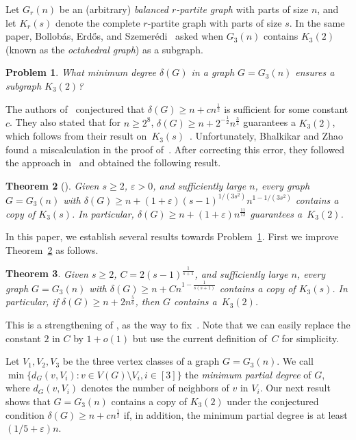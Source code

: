 \documentclass[11pt]{article}
\newtheorem{theorem}{Theorem}[section]
\newtheorem{problem}[theorem]{Problem}
\newcommand{\eps}{\varepsilon}
\numberwithin{equation}{section}
\begin{document}
	Let $G_r(n)$ be an (arbitrary) \emph{balanced $r$-partite graph} with parts of size $n$, and let $K_r(s)$ denote the complete $r$-partite graph with parts of size $s$. In the same paper, Bollob\'{a}s, Erd\H{o}s, and Szemer\'{e}di~\cite{bollobas1975complete} asked when $G_3(n)$ contains $K_3(2)$ (known as the \emph{octahedral graph}) as a subgraph.
	\begin{problem}\label{prob2}
		What minimum degree $\delta(G)$ in a graph $G=G_3(n)$ ensures a subgraph $K_3(2)$?
	\end{problem}
	The authors of~\cite{bollobas1975complete} conjectured that $\delta(G)\geq n+cn^{\frac{1}{2}}$ is sufficient for some constant $c$.
	They also stated that for $n\geq 2^8$, $\delta(G)\geq n+2^{-\frac{1}{2}}n^{\frac{3}{4}}$ guarantees a $K_3(2)$, which follows from their result on~$K_3(s)$~\cite[Theorem 2.6]{bollobas1975complete}. Unfortunately, Bhalkikar and Zhao~\cite{bhalkikar2023subgraphs} found a miscalculation in the proof of~\cite[Theorem 2.6]{bollobas1975complete}. After correcting this error, they followed the approach in~\cite{bollobas1975complete} and obtained the following result.
	\begin{theorem}[\cite{bhalkikar2023subgraphs}]\label{thmzhao}
		Given $s\geq 2$, $\eps>0$, and sufficiently large $n$, every graph $G = G_3(n)$ with $\delta(G) \geq n + (1+\eps)(s-1)^{1/(3s^2)} n^{1-1/(3s^2)}$ contains a copy of $K_3(s)$. In particular, $\delta(G)\geq n+(1+\eps)n^{\frac{11}{12}}$ guarantees a~$K_3(2)$.
	\end{theorem}
	
	In this paper, we establish several results towards Problem~\ref{prob2}. 
	First we improve Theorem~\ref{thmzhao} as follows.

		\begin{theorem}\label{thmk3s}
		Given $s\ge 2$, $C= 2(s-1)^{\frac{1}{s+1}}$, and sufficiently large $n$, every graph $G = G_3(n)$ with 
		$\delta(G)\geq n+Cn^{1-\frac{1}{s(s+1)}}$ contains a copy of $K_3(s)$.
		In particular, if $\delta(G)\geq n+2n^{\frac{5}{6}}$, then $G$ contains a~$K_3(2)$.
	\end{theorem}
	
		This is a strengthening of \cite{bhalkikar2023subgraphs}, as the way to fix~\cite{bollobas1975complete}. Note that we can easily replace the constant $2$ in $C$ by $1+o(1)$ but use the current definition of~$C$ for simplicity.
	
	Let $V_1,V_2,V_3$ be the three vertex classes of a graph $G=G_3(n)$. 
	We call $\min\{d_G(v,V_i): v\in V(G)\setminus V_i, i\in [3]\}$ the {\it minimum partial degree} of $G$,
	where $d_G(v,V_i)$ denotes the number of neighbors of $v$ in $V_i$. 
	Our next result shows that $G=G_3(n)$ contains a copy of $K_3(2)$ under the conjectured condition $\delta(G)\geq n+cn^{\frac{1}{2}}$ if, in addition, the minimum partial degree is at least $(1/5+\varepsilon)n$. 
\end{document}
